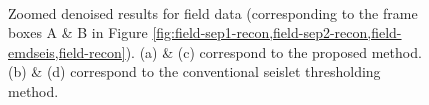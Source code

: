 {\begin{figure}[htb!]
  \centering
  \\
   \caption{Zoomed denoised results for field data (corresponding to the frame boxes A \& B in Figure \ref{fig:field-sep1-recon,field-sep2-recon,field-emdseis,field-recon}). (a) \& (c) correspond to the proposed method. (b) \& (d) correspond to the conventional seislet thresholding method.}
   \label{fig:zoom2-emdseis,zoom2-recon,zoom1-emdseis,zoom1-recon}
\end{figure}



}

